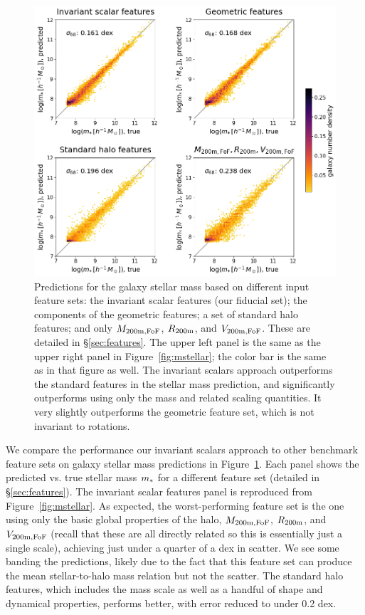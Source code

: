 \begin{figure}
    \centering
    \includegraphics[width=0.7\columnwidth]{feature_comparison_mstellar.png}
    \caption{Predictions for the galaxy stellar mass based on different input feature sets: the invariant scalar features (our fiducial set); the components of the geometric features; a set of standard halo features; and only $M_\mathrm{200m,FoF}$, $R_\mathrm{200m}$, and $V_\mathrm{200m,FoF}$. These are detailed in \S\ref{sec:features}. The upper left panel is the same as the upper right panel in Figure~\ref{fig:mstellar}; the color bar is the same as in that figure as well. The invariant scalars approach outperforms the standard features in the stellar mass prediction, and significantly outperforms using only the mass and related scaling quantities. It very slightly outperforms the geometric feature set, which is not invariant to rotations.}
    \label{fig:mstellar_compare}
\end{figure}

We compare the performance our invariant scalars approach to other benchmark feature sets on galaxy stellar mass predictions in Figure~\ref{fig:mstellar_compare}.
Each panel shows the predicted vs. true stellar mass $m_*$ for a different feature set (detailed in \S\ref{sec:features}).
The invariant scalar features panel is reproduced from Figure~\ref{fig:mstellar}.
As expected, the worst-performing feature set is the one using only the basic global properties of the halo, $M_\mathrm{200m,FoF}$, $R_\mathrm{200m}$, and $V_\mathrm{200m,FoF}$ (recall that these are all directly related so this is essentially just a single scale), achieving just under a quarter of a dex in scatter.
We see some banding the predictions, likely due to the fact that this feature set can produce the mean stellar-to-halo mass relation but not the scatter.
The standard halo features, which includes the mass scale as well as a handful of shape and dynamical properties, performs better, with error reduced to under 0.2 dex. 

